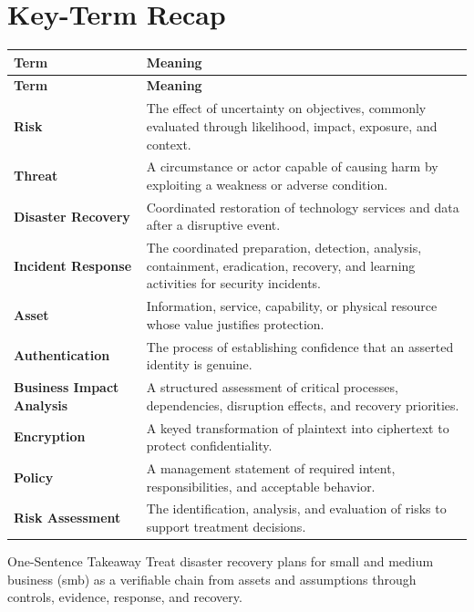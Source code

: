 \documentclass[11pt,letterpaper]{article}
\begin{document}
\section*{Key-Term Recap}
\begin{longtable}{>{\raggedright\arraybackslash}p{}>{\raggedright\arraybackslash}p{}}
\toprule\rowcolor{Navy}\color{white}\textbf{Term} & \color{white}\textbf{Meaning}\\\midrule
\endfirsthead
\toprule\rowcolor{Navy}\color{white}\textbf{Term} & \color{white}\textbf{Meaning}\\\midrule
\endhead
\textbf{Risk} & The effect of uncertainty on objectives, commonly evaluated through likelihood, impact, exposure, and context. \\\midrule
\textbf{Threat} & A circumstance or actor capable of causing harm by exploiting a weakness or adverse condition. \\\midrule
\textbf{Disaster Recovery} & Coordinated restoration of technology services and data after a disruptive event. \\\midrule
\textbf{Incident Response} & The coordinated preparation, detection, analysis, containment, eradication, recovery, and learning activities for security incidents. \\\midrule
\textbf{Asset} & Information, service, capability, or physical resource whose value justifies protection. \\\midrule
\textbf{Authentication} & The process of establishing confidence that an asserted identity is genuine. \\\midrule
\textbf{Business Impact Analysis} & A structured assessment of critical processes, dependencies, disruption effects, and recovery priorities. \\\midrule
\textbf{Encryption} & A keyed transformation of plaintext into ciphertext to protect confidentiality. \\\midrule
\textbf{Policy} & A management statement of required intent, responsibilities, and acceptable behavior. \\\midrule
\textbf{Risk Assessment} & The identification, analysis, and evaluation of risks to support treatment decisions. \\\midrule
\bottomrule
\end{longtable}
\begin{CornellExamBox}{One-Sentence Takeaway}
Treat disaster recovery plans for small and medium business (smb) as a verifiable chain from assets and assumptions through controls, evidence, response, and recovery.
\end{CornellExamBox}
\end{document}
